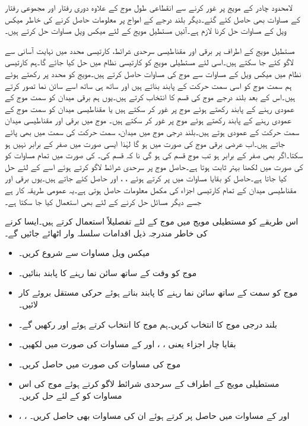 لامحدود چادر کے مویج پر غور کرنے سے انقطاعی طول موج کے علاوہ دوری رفتار اور مجموعی رفتار کے مساوات بھی حاصل کئے گئے۔دیگر بلند درجے کے امواج پر معلومات حاصل کرنے کی خاطر میکس ویل کے مساوات حل کرنا لازم ہے۔آئیں  مستطیل مویج کے لئے میکس ویل مساوات حل کرتے ہیں۔

مستطیل مویج کے اطراف پر برقی اور مقناطیسی سرحدی شرائط، کارتیسی محدد میں نہایت آسانی سے لاگو کئے جا سکتے ہیں۔اسی لئے مستطیلی مویج کو کارتیسی نظام میں حل کیا جائے گا۔ہم کارتیسی نظام میں میکس ویل کے مساوات سے  موج کی مساوات حاصل کرتے ہیں۔مویج کو  محدد پر رکھتے ہوئے ہم سمت موج کو اسی سمت حرکت کے پابند بناتے ہیں اور ساتھ ہی ساتھ اسے سائن نما تصور کرتے ہیں۔اس کے بعد بلند درجے موج کی قسم کا انتخاب کرتے ہیں۔یوں ہم برقی میدان  کو سمت موج کے عمودی رہنے کے پابند رکھتے ہوئے   موج پر غور کر سکتے ہیں یا مقناطیسی میدان کو سمت موج کے عمودی رہنے کے پابند رکھتے ہوئے   موج پر غور کر سکتے ہیں۔ موج میں برقی اور مقناطیسی میدان سمت حرکت کے عمودی ہوتے ہیں۔بلند درجی موج میں میدان، سمت حرکت کی سمت میں بھی پائے جاتے ہیں۔اب عرضی برقی  موج کی صورت میں  ہو گا لہٰذا ایسی صورت میں  صفر کے برابر نہیں ہو سکتا۔اگر  بھی صفر کے برابر ہو تب موج  قسم کی ہو گی نا کہ  قسم کی۔ کی صورت میں تمام مساوات کو  کی صورت میں لکھنا بہتر ثابت ہوتا ہے۔حاصل موج پر سرحدی شرائط لاگو کرتے ہوئے اسے  کے لئے حل کیا جاتا ہے۔حاصل  کو بقایا مساوات میں پر کرتے ہوئے ، ،  اور  حاصل کئے جاتے ہیں۔یوں برقی اور مقناطیسی میدان کے تمام کارتیسی اجزاء کی مکمل معلومات حاصل ہوتی ہے۔یہ عمومی طریقہ کار ہے جسے دیگر مسائل حل کرنے کے لئے بھی استعمال کیا جا سکتا ہے۔

اس طریقے کو مستطیلی مویج میں  موج کے لئے تفصلیلاً  استعمال کرتے ہیں۔ایسا کرنے کی خاطر مندرجہ ذیل اقدامات سلسلہ وار اٹھائے جائیں گے۔
\begin{itemize}
\item
میکس ویل مساوات سے شروع کریں۔
\item
موج کو وقت کے ساتھ سائن نما رہنے کا پابند بنائیں۔
\item
موج کو  سمت کے ساتھ سائن نما رہنے کا پابند بناتے ہوئے  حرکی مستقل بروئے کار لائیں۔
\item
بلند درجی موج کا انتخاب کریں۔ہم  موج کا انتخاب کرتے ہوئے  اور  رکھیں گے۔
\item
بقایا چار اجزاء یعنی ، ،  اور  کے مساوات  کی صورت میں لکھیں۔
\item
موج کی مساوات  کی صورت میں حاصل کریں۔
\item
مستطیلی مویج کے اطراف کے سرحدی شرائط لاگو کرتے ہوئے موج کی اس مساوات کو  کے لئے حل کریں۔
\item
{}، ،  اور  کے مساوات میں حاصل  پر کرتے ہوئے ان کی مساوات بھی حاصل کریں۔
\end{itemize}  


